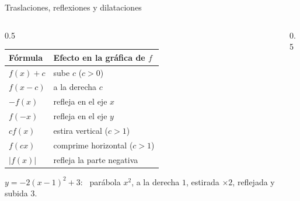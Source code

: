 \documentclass[10pt,aspectratio=169]{beamer}
\begin{document}
\begin{frame}{Traslaciones, reflexiones y dilataciones}
  \begin{columns}
    \begin{column}{0.5\textwidth}
      \renewcommand{\arraystretch}{1.3}
      \small
      \begin{tabular}{l|l}
        \textbf{Fórmula} & \textbf{Efecto en la gráfica de $f$}\\ \hline
        $f(x)+c$ & sube $c$ ($c>0$)\\
        $f(x-c)$ & a la derecha $c$\\
        $-f(x)$ & refleja en el eje $x$\\
        $f(-x)$ & refleja en el eje $y$\\
        $cf(x)$ & estira vertical ($c>1$)\\
        $f(cx)$ & comprime horizontal ($c>1$)\\
        $|f(x)|$ & refleja la parte negativa
      \end{tabular}
      \begin{ejemplo}
        $y=-2(x-1)^2+3$: \ parábola $x^2$, a la derecha $1$, estirada $\times2$, reflejada y subida $3$.
      \end{ejemplo}
    \end{column}
    \begin{column}{0.5\textwidth}
      \centering
    \end{column}
  \end{columns}
\end{frame}
\end{document}
